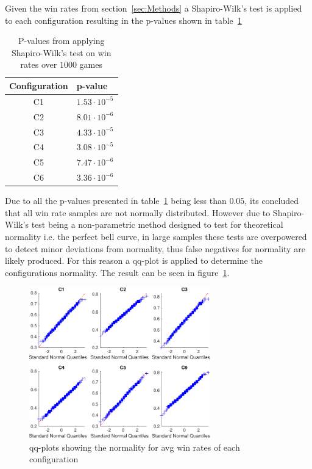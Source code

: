 Given the win rates from section~\ref{sec:Methods}
a Shapiro-Wilk's test is applied to each configuration
resulting in the p-values shown in table~\ref{tab:shapiro-wilks}
\begin{table}[H]
	\begin{center}
		\caption{P-values from applying Shapiro-Wilk's test on win rates over $1000$ games}
		\label{tab:shapiro-wilks}
		\begin{tabular}[c]{|c|l|}
			\hline
			Configuration &     p-value             \\ \hline
			C1            &    $1.53\cdot10^{-5}$   \\
			C2            &    $8.01\cdot 10^{-6}$  \\
			C3            &    $4.33\cdot 10^{-5}$  \\
			C4            &    $3.08 \cdot 10^{-5}$ \\ 
			C5            &    $7.47\cdot 10^{-6}$  \\ 
			C6            &    $3.36\cdot10^{-6}$   \\ \hline
		\end{tabular}
	\end{center}
\end{table}
Due to all the p-values presented in table~\ref{tab:shapiro-wilks}
being less than $0.05$, its concluded that all win rate samples
are not normally distributed.
However due to Shapiro-Wilk's test being a non-parametric method designed to test for 
theoretical normality i.e. the perfect bell curve, in large samples these tests are overpowered 
to detect minor deviations from normality, thus false negatives for normality are likely produced.
For this reason a qq-plot is applied to determine the configurations normality. 
The result can be seen in figure~\ref{fig:qqplots}.
\begin{figure}[h]
	\begin{small}
		\begin{center}
			\includegraphics[width=0.7\textwidth]{fig/myfigure.pdf}
		\end{center}
		\caption{qq-plots showing the normality for avg win rates of each configuration}
		\label{fig:qqplots}
	\end{small}
\end{figure}
